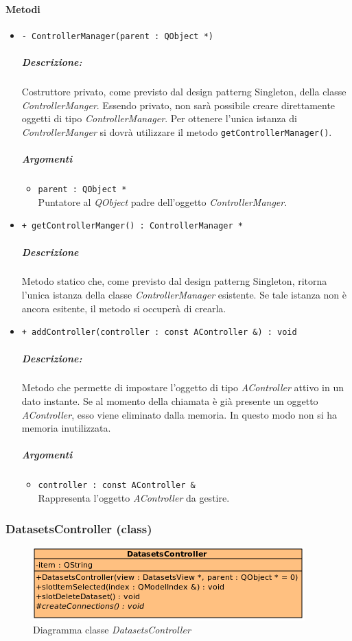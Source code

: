 	\paragraph{\color{black}Metodi}
		\begin{itemize}
			\item \color{blue} \verb!- ControllerManager(parent : QObject *)!
			\color{black}
			\subparagraph{Descrizione:} Costruttore privato, come previsto dal design patterng\g{} Singleton, della classe \textsl{ControllerManger}. Essendo privato, non sarà possibile creare direttamente oggetti di tipo \textsl{ControllerManager}. Per ottenere l'unica istanza di \textsl{ControllerManger} si dovrà utilizzare il metodo \verb!getControllerManager()!.
			\color{black}
			\subparagraph{Argomenti}
			\begin{itemize}
				\item \color{RoyalPurple} \verb!parent : QObject *!\\				
\color{black} Puntatore al \textsl{QObject} padre dell'oggetto \textsl{ControllerManger}.
			\end{itemize}
			\item \color{blue} \verb!+ getControllerManger() : ControllerManager *!
			\color{black}
			\subparagraph{Descrizione} Metodo statico che, come previsto dal design patterng\g{} Singleton, ritorna l'unica istanza della classe \textsl{ControllerManager} esistente. Se tale istanza non è ancora esitente, il metodo si occuperà di crearla.
			\item \color{blue} \verb!+ addController(controller : const AController &) : void!
			\color{black}
			\subparagraph{Descrizione:} Metodo che permette di impostare l'oggetto di tipo \textsl{AController} attivo in un dato instante. Se al momento della chiamata è già presente un oggetto \textsl{AController}, esso viene eliminato dalla memoria. In questo modo non si ha memoria inutilizzata.
			\color{black}
			\subparagraph{Argomenti}
			\begin{itemize}
				\item \color{RoyalPurple} \verb!controller : const AController &!\\				
\color{black} Rappresenta l'oggetto \textsl{AController} da gestire.
			\end{itemize}
		\end{itemize}
	\subsubsection{DatasetsController (class)}
	\begin{figure}[!h]
		\centering
		\includegraphics[scale=2.75]{./Content/Immagini/controller/DatasetsController}
		\caption{Diagramma classe \textsl{DatasetsController}}
	\end{figure}

